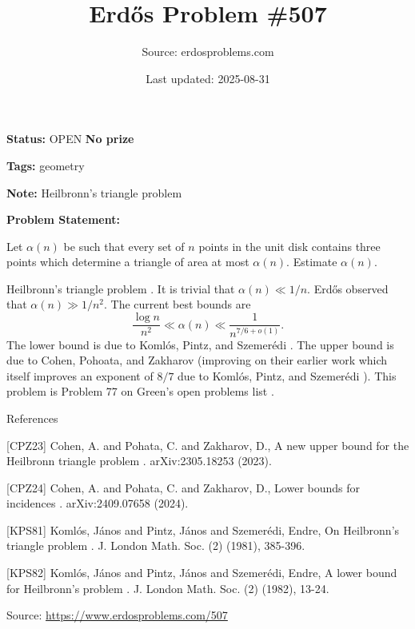 \documentclass{article}
\title{Erd\H{o}s Problem \#507}
\date{Last updated: 2025-08-31}
\author{Source: erdosproblems.com}
\begin{document}
\maketitle

\noindent\textbf{Status:} OPEN \quad \textbf{No prize}

\noindent\textbf{Tags:} geometry

\medskip
\noindent\textbf{Note:} Heilbronn's triangle problem

\medskip

\noindent\textbf{Problem Statement:}

Let $\alpha(n)$ be such that every set of $n$ points in the unit disk contains three points which determine a triangle of area at most $\alpha(n)$. Estimate $\alpha(n)$.




Heilbronn's triangle problem . It is trivial that $\alpha(n) \ll 1/n$. Erd\H{o}s observed that $\alpha(n)\gg 1/n^2$. The current best bounds are\[\frac{\log n}{n^2}\ll \alpha(n) \ll \frac{1}{n^{7/6+o(1)}}.\]The lower bound is due to Koml\'{o}s, Pintz, and Szemer\'{e}di \cite{KPS82}. The upper bound is due to Cohen, Pohoata, and Zakharov \cite{CPZ24} (improving on their earlier work \cite{CPZ23} which itself improves an exponent of $8/7$ due to Koml\'{o}s, Pintz, and Szemer\'{e}di \cite{KPS81}). This problem is Problem 77 on Green's open problems list .




References

[CPZ23] Cohen, A. and Pohata, C. and Zakharov, D., A new upper bound for the Heilbronn triangle problem . arXiv:2305.18253 (2023).

[CPZ24] Cohen, A. and Pohata, C. and Zakharov, D., Lower bounds for incidences . arXiv:2409.07658 (2024).

[KPS81] Koml\'{o}s, J\'{a}nos and Pintz, J\'{a}nos and Szemer\'{e}di, Endre, On Heilbronn's triangle problem . J. London Math. Soc. (2) (1981), 385-396.

[KPS82] Koml\'{o}s, J\'{a}nos and Pintz, J\'{a}nos and Szemer\'{e}di, Endre, A lower bound for Heilbronn's problem . J. London Math. Soc. (2) (1982), 13-24.


\bigskip
\noindent\small{Source: \url{https://www.erdosproblems.com/507}}
\end{document}
